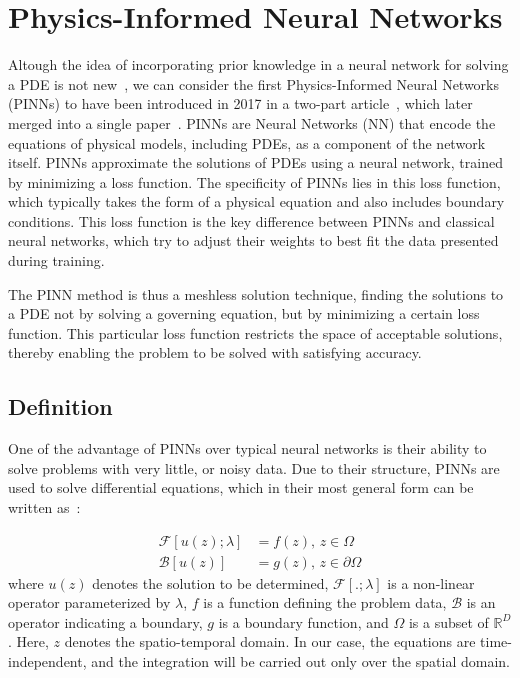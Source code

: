 \chapter{Physics-Informed Neural Networks}\label{ch:pinns}

Altough the idea of incorporating prior knowledge in a neural network for solving a PDE is not new~\cite{dissanayake1994}, we can consider the first Physics-Informed Neural Networks (PINNs) to have been introduced in 2017 in a two-part article~\cite{raissi_physics_2017,raissi_physics_2017-1}, which later merged into a single paper~\cite{raissi_physics-informed_2019}. PINNs are Neural Networks (NN) that encode the equations of physical models, including PDEs, as a component of the network itself. PINNs approximate the solutions of PDEs using a neural network, trained by minimizing a loss function. The specificity of PINNs lies in this loss function, which typically takes the form of a physical equation and also includes boundary conditions. This loss function is the key difference between PINNs and classical neural networks, which try to adjust their weights to best fit the data presented during training.
\par The PINN method is thus a meshless solution technique, finding the solutions to a PDE not by solving a governing equation, but by minimizing a certain loss function. This particular loss function restricts the space of acceptable solutions, thereby enabling the problem to be solved with satisfying accuracy.

\section{Definition}

One of the advantage of PINNs over typical neural networks is their ability to solve problems with very little, or noisy data. Due to their structure, PINNs are used to solve differential equations, which in their most general form can be written as~\cite{cuomo_scientific_2022}:

\begin{equation}
    \label{eq:pde-general}
    \begin{split}
        \mathcal{F}\left[ u(z); \lambda \right] &= f(z) \text{, } z \in \Omega\\
        \mathcal{B}\left[ u(z) \right] &= g(z) \text{, } z \in \partial\Omega
    \end{split}
\end{equation} where $u(z)$ denotes the solution to be determined, $\mathcal{F}[.;\lambda]$ is a non-linear operator parameterized by $\lambda$, $f$ is a function defining the problem data, $\mathcal{B}$ is an operator indicating a boundary, $g$ is a boundary function, and $\Omega$ is a subset of $\mathbb{R}^D$. Here, $z$ denotes the spatio-temporal domain. In our case, the equations are time-independent, and the integration will be carried out only over the spatial domain.

